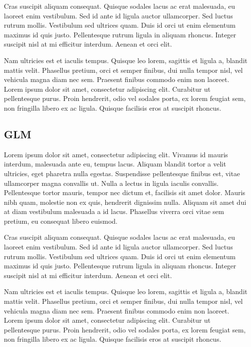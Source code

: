 \documentclass[a4paper, nobind]{templates/ociamthesis}
\theoremstyle{definition}
\theoremstyle{definition}
\theoremstyle{definition}
\theoremstyle{remark}
\begin{document}
Cras suscipit aliquam consequat. Quisque sodales lacus ac erat malesuada, eu laoreet enim vestibulum. Sed id ante id ligula auctor ullamcorper. Sed luctus rutrum mollis. Vestibulum sed ultrices quam. Duis id orci ut enim elementum maximus id quis justo. Pellentesque rutrum ligula in aliquam rhoncus. Integer suscipit nisl at mi efficitur interdum. Aenean et orci elit.

Nam ultricies est et iaculis tempus. Quisque leo lorem, sagittis et ligula a, blandit mattis velit. Phasellus pretium, orci et semper finibus, dui nulla tempor nisl, vel vehicula magna diam nec sem. Praesent finibus commodo enim non laoreet. Lorem ipsum dolor sit amet, consectetur adipiscing elit. Curabitur ut pellentesque purus. Proin hendrerit, odio vel sodales porta, ex lorem feugiat sem, non fringilla libero ex ac ligula. Quisque facilisis eros at suscipit rhoncus.

\hypertarget{glm}{%
\subsection{GLM}\label{glm}}

Lorem ipsum dolor sit amet, consectetur adipiscing elit. Vivamus id mauris interdum, malesuada ante eu, tempus lacus. Aliquam blandit tortor a velit ultricies, eget pharetra nulla egestas. Suspendisse pellentesque finibus est, vitae ullamcorper magna convallis ut. Nulla a lectus in ligula iaculis convallis. Pellentesque tortor mauris, tempor nec dictum et, facilisis sit amet dolor. Mauris nibh quam, molestie non ex quis, hendrerit dignissim nulla. Aliquam sit amet dui at diam vestibulum malesuada a id lacus. Phasellus viverra orci vitae sem pretium, eu consequat libero euismod.

Cras suscipit aliquam consequat. Quisque sodales lacus ac erat malesuada, eu laoreet enim vestibulum. Sed id ante id ligula auctor ullamcorper. Sed luctus rutrum mollis. Vestibulum sed ultrices quam. Duis id orci ut enim elementum maximus id quis justo. Pellentesque rutrum ligula in aliquam rhoncus. Integer suscipit nisl at mi efficitur interdum. Aenean et orci elit.

Nam ultricies est et iaculis tempus. Quisque leo lorem, sagittis et ligula a, blandit mattis velit. Phasellus pretium, orci et semper finibus, dui nulla tempor nisl, vel vehicula magna diam nec sem. Praesent finibus commodo enim non laoreet. Lorem ipsum dolor sit amet, consectetur adipiscing elit. Curabitur ut pellentesque purus. Proin hendrerit, odio vel sodales porta, ex lorem feugiat sem, non fringilla libero ex ac ligula. Quisque facilisis eros at suscipit rhoncus.
\end{document}
